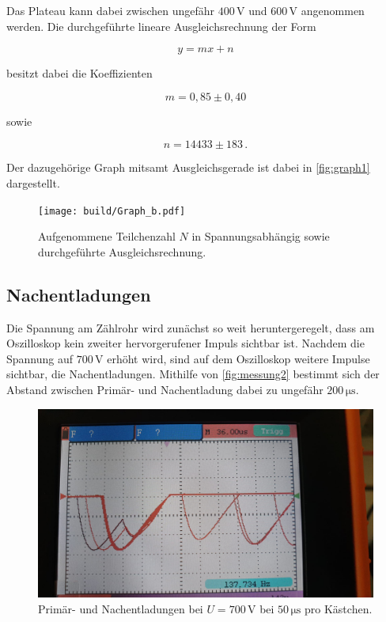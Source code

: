Das Plateau kann dabei zwischen ungefähr $400 \,\unit{\volt}$ und $600 \,\unit{\volt}$ angenommen werden.
Die durchgeführte lineare Ausgleichsrechnung der Form

\begin{equation*}
      y = m x + n
\end{equation*}

besitzt dabei die Koeffizienten

\begin{equation*} 
      m = 0,85 \pm 0,40 
\end{equation*}

sowie

\begin{equation*} 
      n = 14433 \pm 183 \,.
\end{equation*}

Der dazugehörige Graph mitsamt Ausgleichsgerade ist dabei in \autoref{fig:graph1} dargestellt.

\begin{figure}
    \centering
    \texttt{[image: build/Graph\_b.pdf]}
    \caption{Aufgenommene Teilchenzahl $N$ in Spannungsabhängig sowie durchgeführte Ausgleichsrechnung.}
    \label{fig:graph1}
\end{figure}


\subsection{Nachentladungen}

Die Spannung am Zählrohr wird zunächst so weit heruntergeregelt, dass am Oszilloskop kein zweiter hervorgerufener Impuls sichtbar ist.
Nachdem die Spannung auf $700 \,\unit{\volt}$ erhöht wird, sind auf dem Oszilloskop weitere Impulse sichtbar, die Nachentladungen.
Mithilfe von \autoref{fig:messung2} bestimmt sich der Abstand zwischen Primär- und Nachentladung dabei zu ungefähr $200 \,\unit{\micro\second}$.

\begin{figure}
    \centering
    \includegraphics[scale=0.2]{figures/messung2.jpeg}
    \caption{Primär- und Nachentladungen bei $U = 700 \,\unit{\volt}$ bei $50 \,\unit{\micro\second}$ pro Kästchen.}
    \label{fig:messung2}
\end{figure}


